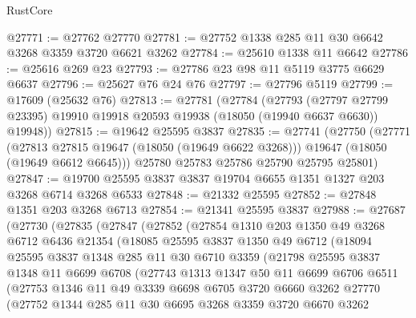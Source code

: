 \begin{lexlean}{RustCore}
\begin{coremodule}
@27771 := @27762 @27770
@27781 := @27752 @1338 @285 @11 @30 @6642 @3268 @3359 @3720 @6621 @3262
@27784 := @25610 @1338 @11 @6642
@27786 := @25616 @269 @23
@27793 := @27786 @23 @98 @11 @5119 @3775 @6629 @6637
@27796 := @25627 @76 @24 @76
@27797 := @27796 @5119
@27799 := @17609 (@25632 @76)
@27813 := @27781
    (@27784
      (@27793
        (@27797 @27799 @23395)
        @19910
        @19918
        @20593
        @19938
        (@18050 (@19940 @6637 @6630))
        @19948))
@27815 := @19642 @25595 @3837
@27835 := @27741
    (@27750
      (@27771
        (@27813 @27815 @19647 (@18050 (@19649 @6622 @3268)))
        @19647
        (@18050 (@19649 @6612 @6645)))
      @25780
      @25783
      @25786
      @25790
      @25795
      @25801)
@27847 := @19700 @25595 @3837 @3837 @19704 @6655 @1351 @1327 @203 @3268 @6714 @3268 @6533
@27848 := @21332 @25595
@27852 := @27848 @1351 @203 @3268 @6713
@27854 := @21341 @25595 @3837
@27988 := @27687
    (@27730
      (@27835
        (@27847
          (@27852
            (@27854
              @1310
              @203
              @1350
              @49
              @3268
              @6712
              @6436
              @21354
              (@18085
                @25595
                @3837
                @1350
                @49
                @6712
                (@18094
                  @25595
                  @3837
                  @1348
                  @285
                  @11
                  @30
                  @6710
                  @3359
                  (@21798
                    @25595
                    @3837
                    @1348
                    @11
                    @6699
                    @6708
                    (@27743
                      @1313
                      @1347
                      @50
                      @11
                      @6699
                      @6706
                      @6511
                      (@27753
                        @1346
                        @11
                        @49
                        @3339
                        @6698
                        @6705
                        @3720
                        @6660
                        @3262
                        @27770
                        (@27752
                          @1344
                          @285
                          @11
                          @30
                          @6695
                          @3268
                          @3359
                          @3720
                          @6670
                          @3262

\end{coremodule}
\end{lexlean}
